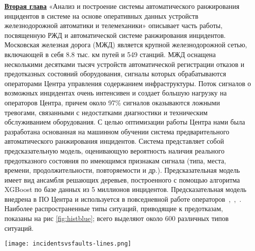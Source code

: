\underline{\textbf{Вторая глава}} «Анализ и построение системы автоматического ранжирования инцидентов в системе на основе оперативных данных устройств железнодорожной автоматики и телемеханики» описывает часть работы, посвященную РЖД и автоматической системе ранжирования инцидентов.
Московская железная дорога (МЖД) является крупной железнодорожной сетью, включающей в себя 8.8 тыс. км путей и 549 станций. МЖД оснащена несколькими десятками тысяч устройств автоматической регистрации отказов и предотказных состояний оборудования, сигналы которых обрабатываются операторами Центра управления содержанием инфраструктуры. Поток сигналов о возможных инцидентах очень интенсивен и создает большую нагрузку на операторов Центра, причем около 97\% сигналов оказываются ложными тревогами, связанными с недостатками диагностики и техническим обслуживанием оборудования. С целью оптимизации работы Центра нами была разработана основанная на машинном обучении система предварительного автоматического ранжирования инцидентов. Система представляет собой предсказательную модель, оценивающую вероятность наличия реального предотказного состояния по имеющимся признакам сигнала (типа, места, времени,  продолжительности, повторяемости и др.). Предсказательная модель имеет вид ансамбля решающих деревьев, построенного с помощью алгоритма XGBoost по базе данных из 5 миллионов инцидентов. Предсказательная модель внедрена в ПО Центра и используется в повседневной работе операторов~\cite{bulletin-rzd},~\cite{itivs-2017},~\cite{icmla-2017}. Наиболее распространенные типы ситуаций, приводящие к предотказам, показаны на рис \ref{fig:histblue}; всего выделяют около 600 различных типов ситуаций.

\begin{figure*}
\centering
\texttt{[image: incidentsvsfaults-lines.png]}
\caption{Наиболее распространённые типы ситуаций, приводящих к предотказу}
\centering
\label{fig:histblue}
\end{figure*}

